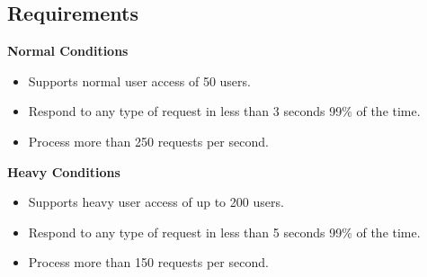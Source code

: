 \documentclass[a4paper,11pt,openright,BCOR=15mm]{scrbook}
\begin{document}
\subsection{Requirements}
\textbf{Normal Conditions}
\begin{itemize}
	\item Supports normal user access of 50 users.
	\item Respond to any type of request in less than 3 seconds 99\% of the time.
	\item Process more than 250 requests per second.
\end{itemize}



\textbf{Heavy Conditions}
\begin{itemize}
	\item Supports heavy user access of up to 200 users.
	\item Respond to any type of request in less than 5 seconds 99\% of the time.
	\item Process more than 150 requests per second.
\end{itemize}
\end{document}
